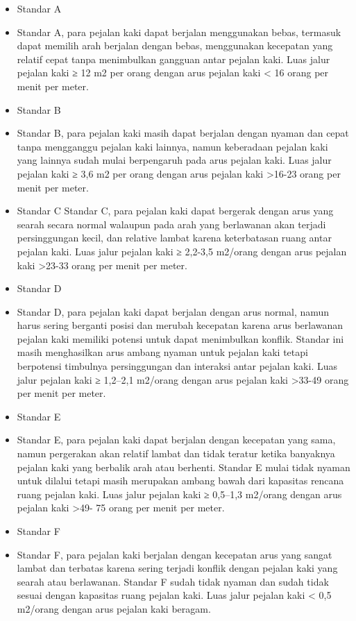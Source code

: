 \documentclass[../rumukota.tex]{subfiles}
\begin{document}
\begin{itemize}

	\item Standar A
	\item[] Standar A, para pejalan kaki dapat berjalan menggunakan bebas, termasuk dapat memilih arah berjalan dengan bebas, menggunakan kecepatan yang relatif cepat tanpa menimbulkan gangguan antar pejalan kaki. Luas jalur pejalan kaki
	      ≥ 12 m2 per orang dengan arus pejalan kaki < 16 orang per menit per meter.
	\item Standar B
	\item[] Standar B, para pejalan kaki masih dapat berjalan dengan nyaman dan cepat tanpa mengganggu pejalan kaki lainnya, namun keberadaan pejalan kaki yang lainnya sudah mulai berpengaruh pada arus pejalan kaki. Luas jalur pejalan kaki ≥ 3,6 m2 per orang dengan arus pejalan kaki >16-23 orang per menit per meter.

	\item Standar C
	      Standar C, para pejalan kaki dapat bergerak dengan arus yang searah secara normal walaupun pada arah yang berlawanan akan terjadi persinggungan kecil, dan relative lambat karena keterbatasan ruang antar pejalan kaki. Luas jalur pejalan kaki ≥ 2,2-3,5 m2/orang dengan arus pejalan kaki >23-33 orang per menit per meter.

	\item Standar D
	\item[] Standar D, para pejalan kaki dapat berjalan dengan arus normal, namun harus sering berganti posisi dan merubah kecepatan karena arus berlawanan pejalan kaki memiliki potensi untuk dapat menimbulkan konflik. Standar ini masih menghasilkan arus ambang nyaman untuk pejalan kaki tetapi berpotensi timbulnya persinggungan dan interaksi antar pejalan kaki. Luas jalur pejalan kaki ≥ 1,2–2,1 m2/orang dengan arus pejalan kaki >33-49 orang per menit per meter.

	\item Standar E
	\item[] Standar E, para pejalan kaki dapat berjalan dengan kecepatan yang sama, namun pergerakan akan relatif lambat dan tidak teratur ketika banyaknya pejalan kaki yang berbalik arah atau berhenti. Standar E mulai tidak nyaman untuk dilalui tetapi masih merupakan ambang bawah dari kapasitas rencana ruang pejalan kaki. Luas jalur pejalan kaki ≥ 0,5–1,3 m2/orang dengan arus pejalan kaki >49- 75 orang per menit per meter.

	\item Standar F
	\item[] Standar F, para pejalan kaki berjalan dengan kecepatan arus yang sangat lambat dan terbatas karena sering terjadi konflik dengan pejalan kaki yang searah atau berlawanan. Standar F sudah tidak nyaman dan sudah tidak sesuai dengan kapasitas ruang pejalan kaki. Luas jalur pejalan kaki < 0,5 m2/orang dengan arus pejalan kaki beragam.

\end{itemize}
\end{document}
